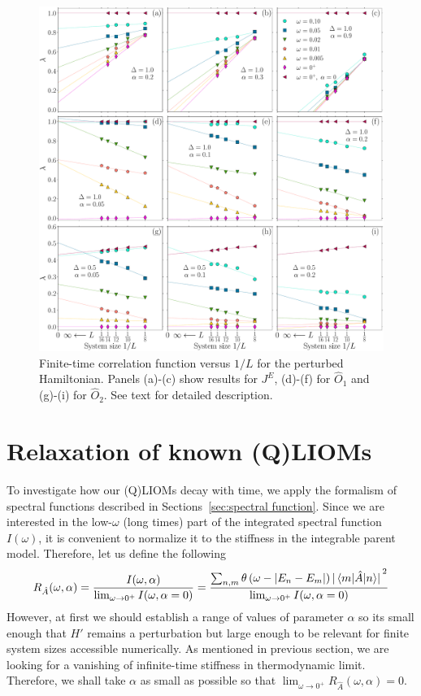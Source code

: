\begin{figure}[htbp]
  \centering
  \includegraphics[width=\textwidth]{Figures/lioms_decay.pdf}
  \caption{Finite-time correlation function versus \(1/L\) for the perturbed Hamiltonian.
  Panels (a)-(c) show results for \(J^E\), (d)-(f) for \(\hat{O}_1\) and (g)-(i) for \(\hat{O}_2\).
  See text for detailed description.}
  \label{fig:lioms decay}
\end{figure}

\newcommand{\figsize}{0.8}
\setlength{\belowcaptionskip}{0pt}
\section{Relaxation of known (Q)LIOMs}
To investigate how our (Q)LIOMs decay with time, we apply the formalism of spectral functions
described in Sections~\ref{sec:spectral function}.
Since we are interested in the low-\(\omega\) (long times) part of the integrated spectral function
\(I(\omega)\), it is convenient to normalize it to the stiffness in the integrable parent model.
Therefore, let us define the following~\autocite{Mierzejewski2015Approx}
\begin{equation}
  R_{\hat{A}}(\omega,\alpha) = \frac{I(\omega,\alpha)}{\lim_{\omega \to 0^{+}} I(\omega,\alpha=0)} = 
  \frac{\sum_{n,m}\theta\left(\omega -\abs{E_n-E_m}\right) \abs*{\matrixel{m}{\hat{A}}{n}}^2}
  {\lim_{\omega \to 0^{+}} I(\omega,\alpha=0)}
  \label{eq:normalized integrated spectral function}
\end{equation}
However, at first we should establish a range of values of
parameter \(\alpha\) so its small enough that \(H'\) remains a perturbation but large enough
to be relevant for finite system sizes accessible numerically. As mentioned in previous section,
we are looking for a vanishing of infinite-time stiffness in thermodynamic limit. Therefore, we shall
take \(\alpha\) as small as possible so that  \(\lim_{\omega\to 0^{+}} R_{\hat{A}}
(\omega,\alpha) = 0\).

